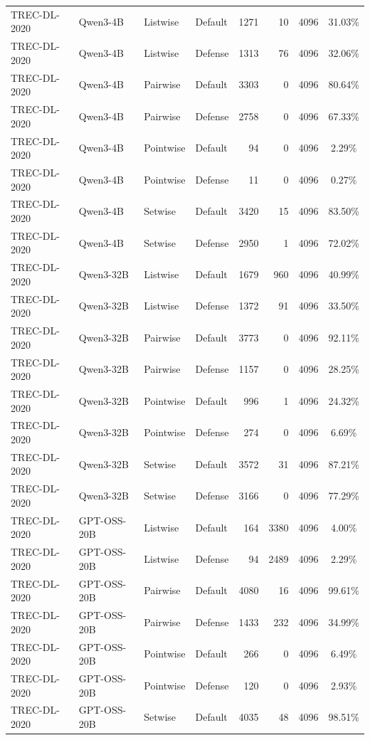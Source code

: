 \begin{table}[t]
\begin{tabular}{ll l l r r r c}
TREC-DL-2020 & Qwen3-4B & Listwise & Default & 1271 & 10 & 4096 & 31.03\% \\
TREC-DL-2020 & Qwen3-4B & Listwise & Defense & 1313 & 76 & 4096 & 32.06\% \\
TREC-DL-2020 & Qwen3-4B & Pairwise & Default & 3303 & 0 & 4096 & 80.64\% \\
TREC-DL-2020 & Qwen3-4B & Pairwise & Defense & 2758 & 0 & 4096 & 67.33\% \\
TREC-DL-2020 & Qwen3-4B & Pointwise & Default & 94 & 0 & 4096 & 2.29\% \\
TREC-DL-2020 & Qwen3-4B & Pointwise & Defense & 11 & 0 & 4096 & 0.27\% \\
TREC-DL-2020 & Qwen3-4B & Setwise & Default & 3420 & 15 & 4096 & 83.50\% \\
TREC-DL-2020 & Qwen3-4B & Setwise & Defense & 2950 & 1 & 4096 & 72.02\% \\
TREC-DL-2020 & Qwen3-32B & Listwise & Default & 1679 & 960 & 4096 & 40.99\% \\
TREC-DL-2020 & Qwen3-32B & Listwise & Defense & 1372 & 91 & 4096 & 33.50\% \\
TREC-DL-2020 & Qwen3-32B & Pairwise & Default & 3773 & 0 & 4096 & 92.11\% \\
TREC-DL-2020 & Qwen3-32B & Pairwise & Defense & 1157 & 0 & 4096 & 28.25\% \\
TREC-DL-2020 & Qwen3-32B & Pointwise & Default & 996 & 1 & 4096 & 24.32\% \\
TREC-DL-2020 & Qwen3-32B & Pointwise & Defense & 274 & 0 & 4096 & 6.69\% \\
TREC-DL-2020 & Qwen3-32B & Setwise & Default & 3572 & 31 & 4096 & 87.21\% \\
TREC-DL-2020 & Qwen3-32B & Setwise & Defense & 3166 & 0 & 4096 & 77.29\% \\
TREC-DL-2020 & GPT-OSS-20B & Listwise & Default & 164 & 3380 & 4096 & 4.00\% \\
TREC-DL-2020 & GPT-OSS-20B & Listwise & Defense & 94 & 2489 & 4096 & 2.29\% \\
TREC-DL-2020 & GPT-OSS-20B & Pairwise & Default & 4080 & 16 & 4096 & 99.61\% \\
TREC-DL-2020 & GPT-OSS-20B & Pairwise & Defense & 1433 & 232 & 4096 & 34.99\% \\
TREC-DL-2020 & GPT-OSS-20B & Pointwise & Default & 266 & 0 & 4096 & 6.49\% \\
TREC-DL-2020 & GPT-OSS-20B & Pointwise & Defense & 120 & 0 & 4096 & 2.93\% \\
TREC-DL-2020 & GPT-OSS-20B & Setwise & Default & 4035 & 48 & 4096 & 98.51\% \\

\end{tabular}
\end{table}

